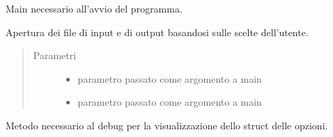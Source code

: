 \documentclass[letterpaper,10pt,italian,openany,oneside]{sphinxmanual}
\begin{document}

\begin{fulllineitems}
\label{\detokenize{code/main:c.main}}
Main necessario all’avvio del programma.

\end{fulllineitems}


\begin{fulllineitems}
\label{\detokenize{code/main:c.parsePaths}}
Apertura dei file di input e di output basandosi sulle scelte dell’utente.
\begin{quote}\begin{description}
\item[{Parametri}] \leavevmode\begin{itemize}
\item {} 
 \textendash{} parametro passato come argomento a main

\item {} 
 \textendash{} parametro passato come argomento a main

\end{itemize}

\end{description}\end{quote}

\end{fulllineitems}


\begin{fulllineitems}
\label{\detokenize{code/main:c.printOpt}}
Metodo necessario al debug per la visualizzazione dello struct delle opzioni.

\end{fulllineitems}

\end{document}
